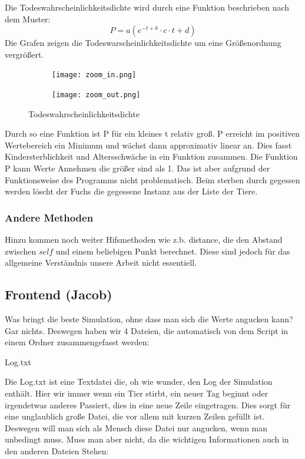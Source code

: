 \documentclass[12pt]{article}
\begin{document}
Die Todeswahrscheinlichkeitsdichte wird durch eine Funktion beschrieben nach dem Muster:
\begin{equation}
    P = a ( {e}^{-t + b} \cdot c \cdot t + d)
\end{equation}
\newpage
Die Grafen zeigen die Todeswarscheinlichkeitsdichte um eine Größenordnung vergrößert.
\begin{figure}[h!]
  \centering
  \begin{subfigure}[b]{0.4\linewidth}
    \texttt{[image: zoom\_in.png]}
  \end{subfigure}
  \begin{subfigure}[b]{0.4\linewidth}
    \texttt{[image: zoom\_out.png]}
  \end{subfigure}
  \caption{Todeswahrscheinlichkeitsdichte}
  \label{fig:coffee}
\end{figure}

Durch so eine Funktion ist P für ein kleines t relativ groß.
P erreicht im positiven Wertebereich ein Minimum und wächst dann approximativ linear an.
Dies fasst Kindersterblichkeit und Altersschwäche in ein Funktion zusammen.
Die Funktion P kann Werte Annehmen die größer sind als 1.
Das ist aber aufgrund der Funktionsweise des Programms nicht problematisch.
Beim sterben durch gegessen werden löscht der Fuchs die gegessene Instanz aus der Liste der Tiere.
\subsubsection{Andere Methoden}
Hinzu kommen noch weiter Hifsmethoden wie z.b. \colorbox{gray!40}{distance}, die
den Abstand zwischen $self$ und einem beliebigen Punkt berechnet.
Diese sind jedoch für das allgemeine Verständnis unsere Arbeit nicht essentiell.
\subsection{Frontend (Jacob)}
Was bringt die beste Simulation, ohne dass man sich die Werte angucken kann? Gar
nichts. Deswegen haben wir 4 Dateien, die automatisch von dem Script in einem Ordner
zusammengefasst werden:

 Log.txt

Die Log.txt ist eine Textdatei die, oh wie wunder, den Log der Simulation enthält.
Hier wir immer wenn ein Tier stirbt, ein neuer Tag beginnt oder irgendetwas anderes
Passiert, dies in eine neue Zeile eingetragen. Dies sorgt für eine unglaublich große
Datei, die vor allem mit kurzen Zeilen gefüllt ist. Deswegen will man sich als
Mensch diese Datei nur angucken, wenn man unbedingt muss. Muss man
aber nicht, da die wichtigen Informationen auch in den anderen Dateien Stehen:
\end{document}
